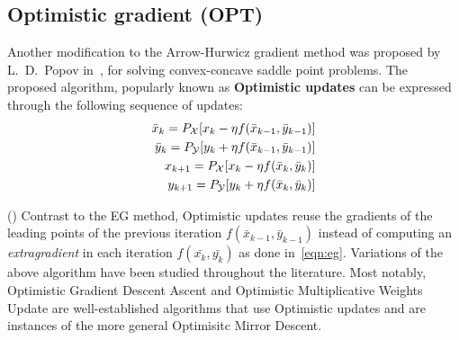 \subsection{Optimistic gradient (OPT)}
Another modification to the Arrow-Hurwicz gradient method was proposed by L.~D.~Popov
in~\cite{popovmodification1980}, for solving convex-concave saddle point problems.
The proposed algorithm, popularly known as \textbf{Optimistic updates} can be expressed through the
following sequence of updates: %
\begin{equation}
	\label{eqn:opt}
	\begin{split}
		\bar{x}_{k} = P_{\mathcal{X}}[x_k - \eta f(\bar{x}_{k-1}, \bar{y}_{k-1})] \\ 
		\bar{y}_{k} = P_{\mathcal{Y}}[y_k + \eta f(\bar{x}_{k-1}, \bar{y}_{k-1})] \\ 
		x_{k+1} = P_{\mathcal{X}}[x_k - \eta f(\bar{x}_k, \bar{y}_k)] \\
		y_{k+1} = P_{\mathcal{Y}}[y_k + \eta f(\bar{x}_k, \bar{y}_k)]
	\end{split}
\end{equation}

() Contrast to the EG method, Optimistic updates reuse the gradients of the leading
points of the previous iteration $f(\bar{x}_{k-1}, \bar{y}_{k-1})$ instead of computing an
\textit{extragradient} in each iteration $f(\bar{x_{k}}, \bar{y_{k}})$ as done in~\ref{eqn:eg}.
Variations of the above algorithm have been studied throughout the literature.
Most notably, Optimistic Gradient Descent Ascent and Optimistic Multiplicative Weights Update are
well-established algorithms that use Optimistic updates and are instances of the more general
Optimisitc Mirror Descent.

